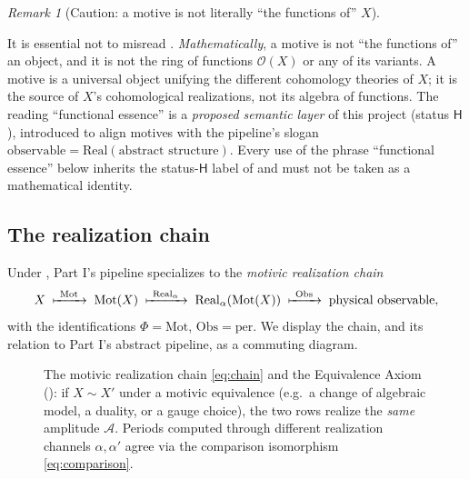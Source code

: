 \documentclass[12pt]{article}
\theoremstyle{definition}
\theoremstyle{remark}
\newtheorem{remark}[theorem]{Remark}
\newcommand{\Mot}{\mathrm{Mot}}
\newcommand{\Real}{\mathrm{Real}}
\newcommand{\Obs}{\mathrm{Obs}}
\newcommand{\per}{\mathrm{per}}
\newcommand{\Am}{\mathcal{A}}
\newcommand{\Hlab}{\ensuremath{\mathsf{H}}}
\begin{document}
\begin{remark}[Caution: a motive is not literally ``the functions of'' $X$]
\label{rem:not-functions}
\begin{mdframed}[linecolor=red!45,linewidth=0.8pt,backgroundcolor=red!4]
It is essential not to misread . \emph{Mathematically}, a motive is not
``the functions of'' an object, and it is not the ring of functions $\mathcal{O}(X)$ or any
of its variants. A motive is a universal object unifying the different cohomology theories of
$X$; it is the source of $X$'s cohomological realizations, not its algebra of functions. The
reading ``functional essence'' is a \emph{proposed semantic layer} of this project (status
\Hlab), introduced to align motives with the pipeline's slogan
$\text{observable}=\Real(\text{abstract structure})$. Every use of the phrase ``functional
essence'' below inherits the status-\Hlab{} label of  and must not be taken as a
mathematical identity.
\end{mdframed}
\end{remark}

\subsection{The realization chain}

Under , Part I's pipeline specializes to the \emph{motivic realization chain}
\begin{equation}
\label{eq:chain}
X \;\xmapsto{\ \Mot\ }\; \Mot(X) \;\xmapsto{\ \Real_\alpha\ }\; \Real_\alpha(\Mot(X))
\;\xmapsto{\ \Obs\ }\; \text{physical observable},
\end{equation}
with the identifications $\Phi=\Mot$, $\Obs=\per$. We display the chain, and its relation
to Part I's abstract pipeline, as a commuting diagram.

\begin{figure}[ht]
\centering
{}
\caption{The motivic realization chain \eqref{eq:chain} and the Equivalence Axiom
(): if $X\sim X'$ under a motivic equivalence (e.g.\ a change of algebraic
model, a duality, or a gauge choice), the two rows realize the \emph{same} amplitude $\Am$.
Periods computed through different realization channels $\alpha,\alpha'$ agree via the
comparison isomorphism \eqref{eq:comparison}.}
\label{fig:chain}
\end{figure}
\end{document}
